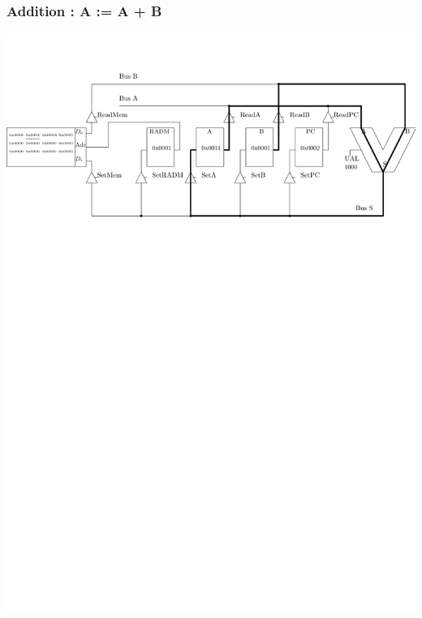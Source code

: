\documentclass{beamer}
\begin{document}
\begin{frame}
\frametitle{Addition : A := A + B}
\centering\includegraphics[width=\linewidth]{Figs/premier_chemin_adda.pdf}
\end{frame}
\end{document}
